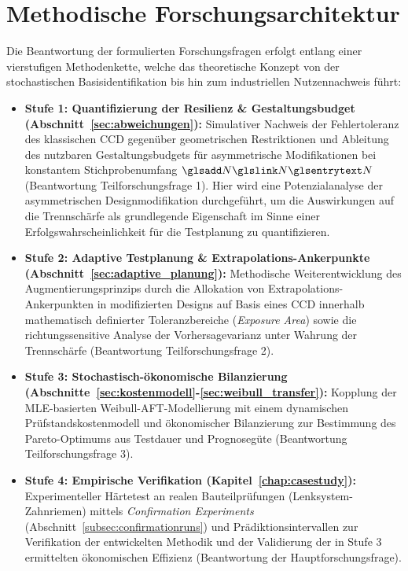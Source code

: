 \section{Methodische Forschungsarchitektur} \label{sec:forschungsarchitektur}

Die Beantwortung der formulierten Forschungsfragen erfolgt entlang einer vierstufigen Methodenkette, welche das theoretische Konzept von der stochastischen Basisidentifikation bis hin zum industriellen Nutzennachweis führt:

\begin{itemize}
    \item \textbf{Stufe 1: Quantifizierung der Resilienz \& Gestaltungsbudget (Abschnitt~\ref{sec:abweichungen}):} Simulativer Nachweis der Fehlertoleranz des klassischen \ac{CCD} gegenüber geometrischen Restriktionen und Ableitung des nutzbaren Gestaltungsbudgets für asymmetrische Modifikationen bei konstantem Stichprobenumfang $\sym{N}$ (Beantwortung Teilforschungsfrage 1). Hier wird eine Potenzialanalyse der asymmetrischen Designmodifikation durchgeführt, um die Auswirkungen auf die Trennschärfe als grundlegende Eigenschaft im Sinne einer Erfolgswahrscheinlichkeit für die Testplanung zu quantifizieren.
    \item \textbf{Stufe 2: Adaptive Testplanung \& Extrapolations-Ankerpunkte (Abschnitt~\ref{sec:adaptive_planung}):} Methodische Weiterentwicklung des Augmentierungsprinzips durch die Allokation von Extrapolations-Ankerpunkten in modifizierten Designs auf Basis eines \ac{CCD} innerhalb mathematisch definierter Toleranzbereiche (\textit{Exposure Area}) sowie die richtungssensitive Analyse der Vorhersagevarianz unter Wahrung der Trennschärfe (Beantwortung Teilforschungsfrage 2).
    \item \textbf{Stufe 3: Stochastisch-ökonomische Bilanzierung (Abschnitte~\ref{sec:kostenmodell}-\ref{sec:weibull_transfer}):} Kopplung der \ac{MLE}-basierten Weibull-\ac{AFT}-Modellierung mit einem dynamischen Prüfstandskostenmodell und ökonomischer Bilanzierung zur Bestimmung des Pareto-Optimums aus Testdauer und Prognosegüte (Beantwortung Teilforschungsfrage 3).
    \item \textbf{Stufe 4: Empirische Verifikation (Kapitel~\ref{chap:casestudy}):} Experimenteller Härtetest an realen Bauteilprüfungen (Lenksystem-Zahnriemen) mittels \textit{Confirmation Experiments} (Abschnitt~\ref{subsec:confirmationruns}) und Prädiktionsintervallen zur Verifikation der entwickelten Methodik und der Validierung der in Stufe 3 ermittelten ökonomischen Effizienz (Beantwortung der Hauptforschungsfrage).
\end{itemize}